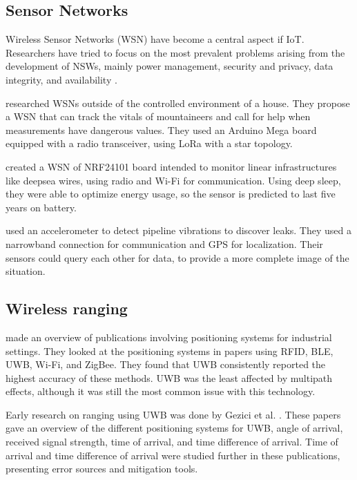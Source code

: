\subsection{Sensor Networks}

Wireless Sensor Networks (WSN) have become a central aspect if IoT.
Researchers have tried to focus on the most prevalent problems arising from the development of NSWs, mainly power management, security and privacy, data integrity, and availability \cite{gulati2022review}.


\cite{garg2021healthcare} researched WSNs outside of the controlled environment of a house. They propose a WSN that can track the vitals of mountaineers and call for help when measurements have dangerous values. 
They used an Arduino Mega board equipped with a radio transceiver, using LoRa with a star topology.


\cite{jones2021wireless} created a WSN of NRF24101 board intended to monitor linear infrastructures like deepsea wires, using radio and Wi-Fi for communication. Using deep sleep, they were able to optimize energy usage, so the sensor is predicted to last five years on battery.


\cite{spandonidis2022evaluation} used an accelerometer to detect pipeline vibrations to discover leaks. 
They used a narrowband connection for communication and GPS for localization.
Their sensors could query each other for data, to provide a more complete image of the situation.


\subsection{Wireless ranging}

\cite{li2024indoor} made an overview of publications involving positioning systems for industrial settings. 
They looked at the positioning systems in papers using RFID, BLE, UWB, Wi-Fi, and ZigBee. They found that UWB consistently reported the highest accuracy of these methods.
UWB was the least affected by multipath effects, although it was still the most common issue with this technology.


Early research on ranging using UWB was done by Gezici et al. \cite{gezici2008survey, gezici2005localization}.
These papers gave an overview of the different positioning systems for UWB, angle of arrival, received signal strength, time of arrival, and time difference of arrival.
Time of arrival and time difference of arrival were studied further in these publications, presenting error sources and mitigation tools.


